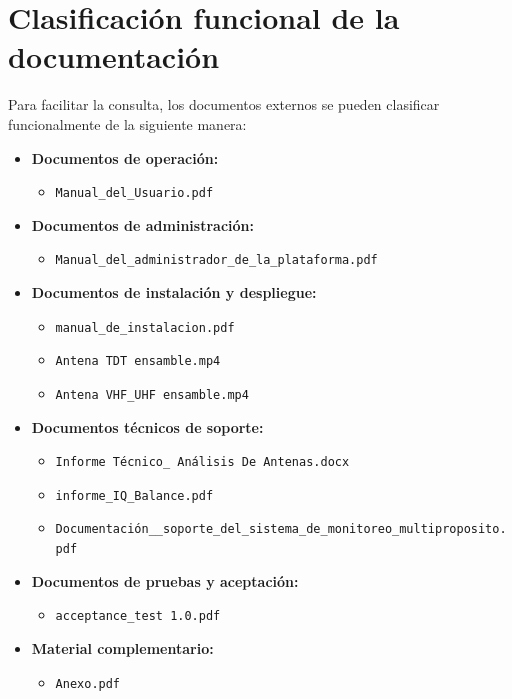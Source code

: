 \section{Clasificación funcional de la documentación}

Para facilitar la consulta, los documentos externos se pueden clasificar funcionalmente de la siguiente manera:

\begin{itemize}
    \item \textbf{Documentos de operación:}
    \begin{itemize}
        \item \texttt{Manual\_del\_Usuario.pdf}
    \end{itemize}
    
    \item \textbf{Documentos de administración:}
    \begin{itemize}
        \item \texttt{Manual\_del\_administrador\_de\_la\_plataforma.pdf}
    \end{itemize}
    
    \item \textbf{Documentos de instalación y despliegue:}
    \begin{itemize}
        \item \texttt{manual\_de\_instalacion.pdf}
        \item \texttt{Antena TDT ensamble.mp4}
        \item \texttt{Antena VHF\_UHF ensamble.mp4}
    \end{itemize}
    
    \item \textbf{Documentos técnicos de soporte:}
    \begin{itemize}
        \item \texttt{Informe Técnico\_ Análisis De Antenas.docx}
        \item \texttt{informe\_IQ\_Balance.pdf}
        \item \texttt{Documentación\_\_soporte\_del\_sistema\_de\_monitoreo\_multiproposito.pdf}
    \end{itemize}
    
    \item \textbf{Documentos de pruebas y aceptación:}
    \begin{itemize}
        \item \texttt{acceptance\_test 1.0.pdf}
    \end{itemize}
    
    \item \textbf{Material complementario:}
    \begin{itemize}
        \item \texttt{Anexo.pdf}
    \end{itemize}
\end{itemize}

